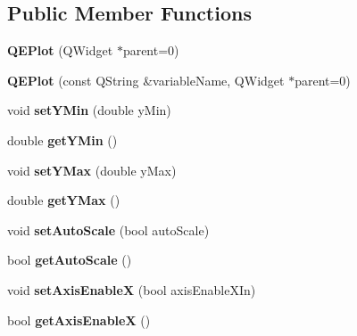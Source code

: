 \subsection*{Public Member Functions}
\begin{DoxyCompactItemize}
\item 
\hypertarget{classQEPlot_a8a9ee9165bb279abe9f2e82eb7638e73}{
{\bfseries QEPlot} (QWidget $\ast$parent=0)}
\label{classQEPlot_a8a9ee9165bb279abe9f2e82eb7638e73}

\item 
\hypertarget{classQEPlot_a745fdc879de2da875c6214c9af73adac}{
{\bfseries QEPlot} (const QString \&variableName, QWidget $\ast$parent=0)}
\label{classQEPlot_a745fdc879de2da875c6214c9af73adac}

\item 
\hypertarget{classQEPlot_a2f912f5042d339aed94d752eefcc00d4}{
void {\bfseries setYMin} (double yMin)}
\label{classQEPlot_a2f912f5042d339aed94d752eefcc00d4}

\item 
\hypertarget{classQEPlot_aad2990cbe03dde6ff72514792e13b45b}{
double {\bfseries getYMin} ()}
\label{classQEPlot_aad2990cbe03dde6ff72514792e13b45b}

\item 
\hypertarget{classQEPlot_a3a1057cdfbc746e1638fe0d5a0bf38a9}{
void {\bfseries setYMax} (double yMax)}
\label{classQEPlot_a3a1057cdfbc746e1638fe0d5a0bf38a9}

\item 
\hypertarget{classQEPlot_a64e10ec58024d6fc1329be4b69c2bf2b}{
double {\bfseries getYMax} ()}
\label{classQEPlot_a64e10ec58024d6fc1329be4b69c2bf2b}

\item 
\hypertarget{classQEPlot_a7ec3d6feb3614e834fa5ed222de69798}{
void {\bfseries setAutoScale} (bool autoScale)}
\label{classQEPlot_a7ec3d6feb3614e834fa5ed222de69798}

\item 
\hypertarget{classQEPlot_afc1a41d360f30e4fbf6d51c4f5cf484a}{
bool {\bfseries getAutoScale} ()}
\label{classQEPlot_afc1a41d360f30e4fbf6d51c4f5cf484a}

\item 
\hypertarget{classQEPlot_a8e3b42e0c087b26dd300e3040fb409f3}{
void {\bfseries setAxisEnableX} (bool axisEnableXIn)}
\label{classQEPlot_a8e3b42e0c087b26dd300e3040fb409f3}

\item 
\hypertarget{classQEPlot_abdae68cc361ee82733097a5e347450f4}{
bool {\bfseries getAxisEnableX} ()}
\label{classQEPlot_abdae68cc361ee82733097a5e347450f4}


\end{DoxyCompactItemize}
